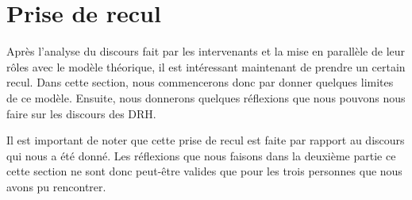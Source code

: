 \section{Prise de recul}

Après l'analyse du discours fait par les intervenants et la mise en parallèle de leur rôles avec le modèle théorique, il est intéressant maintenant de prendre un certain recul. Dans cette section, nous commencerons donc par donner quelques limites de ce modèle. Ensuite, nous donnerons quelques  réflexions que nous pouvons nous faire sur les discours des DRH.\newline

Il est important de noter que cette prise de recul est faite par rapport au discours qui nous a été donné. Les réflexions que nous faisons dans la deuxième partie ce cette section ne sont donc peut-être valides que pour les trois personnes que nous avons pu rencontrer. \newline